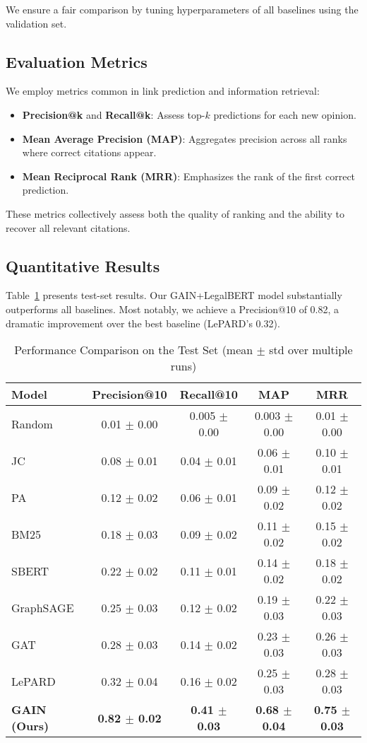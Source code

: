 \documentclass{article}
\begin{document}
We ensure a fair comparison by tuning hyperparameters of all baselines using the validation set.

\subsection{Evaluation Metrics}
We employ metrics common in link prediction and information retrieval:
\begin{itemize}[leftmargin=*]
    \item \textbf{Precision@k} and \textbf{Recall@k}: Assess top-$k$ predictions for each new opinion.
    \item \textbf{Mean Average Precision (MAP)}: Aggregates precision across all ranks where correct citations appear.
    \item \textbf{Mean Reciprocal Rank (MRR)}: Emphasizes the rank of the first correct prediction.
\end{itemize}

These metrics collectively assess both the quality of ranking and the ability to recover all relevant citations.

\subsection{Quantitative Results}
Table~\ref{tab:performance} presents test-set results. Our GAIN+LegalBERT model substantially outperforms all baselines. Most notably, we achieve a Precision@10 of 0.82, a dramatic improvement over the best baseline (LePARD’s 0.32).

\begin{table}[H]
    \centering
    \caption{Performance Comparison on the Test Set (mean $\pm$ std over multiple runs)}
    \label{tab:performance}
    \begin{tabular}{lcccc}
    \toprule
    \textbf{Model} & \textbf{Precision@10} & \textbf{Recall@10} & \textbf{MAP} & \textbf{MRR} \\
    \midrule
    Random & 0.01 $\pm$ 0.00 & 0.005 $\pm$ 0.00 & 0.003 $\pm$ 0.00 & 0.01 $\pm$ 0.00 \\
    JC & 0.08 $\pm$ 0.01 & 0.04 $\pm$ 0.01 & 0.06 $\pm$ 0.01 & 0.10 $\pm$ 0.01 \\
    PA & 0.12 $\pm$ 0.02 & 0.06 $\pm$ 0.01 & 0.09 $\pm$ 0.02 & 0.12 $\pm$ 0.02 \\
    BM25 & 0.18 $\pm$ 0.03 & 0.09 $\pm$ 0.02 & 0.11 $\pm$ 0.02 & 0.15 $\pm$ 0.02 \\
    SBERT & 0.22 $\pm$ 0.02 & 0.11 $\pm$ 0.01 & 0.14 $\pm$ 0.02 & 0.18 $\pm$ 0.02 \\
    GraphSAGE & 0.25 $\pm$ 0.03 & 0.12 $\pm$ 0.02 & 0.19 $\pm$ 0.03 & 0.22 $\pm$ 0.03 \\
    GAT & 0.28 $\pm$ 0.03 & 0.14 $\pm$ 0.02 & 0.23 $\pm$ 0.03 & 0.26 $\pm$ 0.03 \\
    LePARD & 0.32 $\pm$ 0.04 & 0.16 $\pm$ 0.02 & 0.25 $\pm$ 0.03 & 0.28 $\pm$ 0.03 \\
    \textbf{GAIN (Ours)} & \textbf{0.82 $\pm$ 0.02} & \textbf{0.41 $\pm$ 0.03} & \textbf{0.68 $\pm$ 0.04} & \textbf{0.75 $\pm$ 0.03} \\
    \bottomrule
    \end{tabular}
\end{table}
\end{document}
